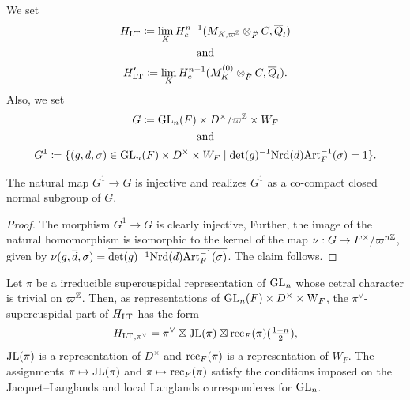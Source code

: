 \documentclass[../main.tex]{subfiles}
\begin{document}
We set 
\begin{equation} \label{eq:DefHLTHprLT}
  \begin{gathered}
  H_{\mathrm{LT}} \coloneqq \lim_K H^{n-1}_c(M_{K, \varpi^{\mathbb{Z}}} \otimes_{\breve F} C, \overline Q_l)
  \\ \text{and} \\
  H_{\mathrm{LT}}' \coloneqq \lim_K H^{n-1}_c(M_{K}^{(0)} \otimes_{\breve F} C, \overline Q_l).
  \end{gathered}
\end{equation}
Also, we set 
\begin{equation}\label{eq:DefGandG1}
\begin{gathered} 
  G \coloneqq \operatorname{GL}_n(F) \times D^\times/\varpi^{\mathbb{Z}} \times W_F \\  \text{ and } \\
  G^1 \coloneqq \{(g,d,\sigma) \in \operatorname{GL}_n(F) \times D^\times \times W_F \mid 
  \det(g)^{-1} \mathrm{Nrd}(d) \mathrm{Art}_F^{-1}(\sigma) = 1\}.
\end{gathered}
\end{equation}
\begin{lem}\label{lem:G1subG}
  The natural map $G^1 \to G$ is injective and realizes $G^1$ as a co-compact closed
  normal subgroup of $G$.
\begin{proof}
  The morphism $G^1 \to G$ is clearly injective, Further, the image of the natural
  homomorphism is isomorphic to the kernel of the map 
  $\nu: G \to F^\times/\varpi^{n\mathbb{Z}}$, given by $\nu(g, \overline d, \sigma) = 
  \overline{\det(g)^{-1}\mathrm{Nrd}(d)\mathrm{Art}_F^{-1}(\sigma)}$. The claim follows.
\end{proof}
\end{lem}

\begin{thm}\label{thm:NonAbLTT}
  Let $\pi$ be a irreducible supercuspidal representation of $\operatorname{GL}_n$ whose cetral 
  character is trivial on $\varpi^{\mathbb{Z}}$. Then, as representations of 
  $\operatorname{GL}_n(F) \times D^\times \times \mathrm W_F$, the $\pi^\vee$-supercuspidal part
  of $H_{\mathrm{LT}}$ has the form
  \begin{equation} \label{eq:DefRecJL}
    {H_{\mathrm{LT}}}_{,\pi^\vee} = \pi^\vee \boxtimes \mathrm{JL}(\pi) \boxtimes
                  \mathrm{rec}_F(\pi)(\tfrac {1-n}2),
  \end{equation}
  $\mathrm{JL}(\pi)$ is a representation of $D^\times$ and $\mathrm{rec}_F(\pi)$ is a representation of 
  $W_F$. The assignments $\pi \mapsto \mathrm{JL}(\pi)$ and 
  $\pi \mapsto \mathrm{rec}_F(\pi)$ satisfy the conditions imposed on the 
  Jacquet--Langlands and local Langlands correspondeces for $\operatorname{GL}_n$.
\end{thm}
\end{document}
